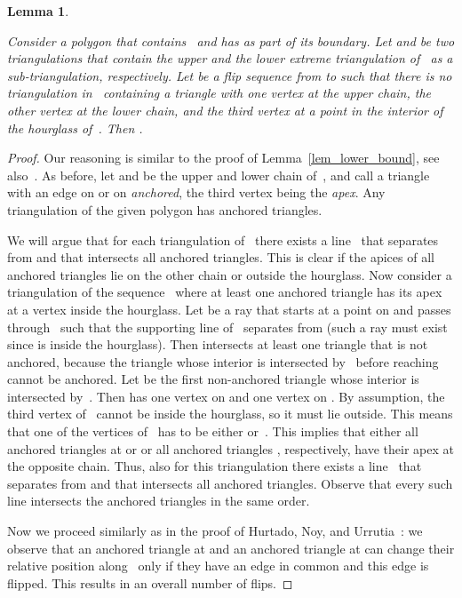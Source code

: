 \documentclass[a4paper,11pt]{article}
\newtheorem{lemma}[theorem]{Lemma}
\newcommand{\qedopt}{}
\begin{document}
\begin{lemma}\label{lem_empty_wedge}
\begin{sloppypar}
Consider a polygon that contains~ and has  as part of 
its boundary. Let  and  be two triangulations that contain the upper and 
the lower extreme triangulation of~ as a sub-triangulation, respectively.
Let  be a flip sequence from  to  such that there is no triangulation in~ containing a triangle with one vertex at the upper chain, the other vertex at the lower chain, and the third vertex at a point in the interior of the hourglass of~.
Then .
\end{sloppypar}
\end{lemma}
\begin{proof}
Our reasoning is similar to the proof of Lemma~\ref{lem_lower_bound}, 
see also~\cite{lubiw}. As before, let  and 
be the upper and lower chain of~, and call a
triangle with an edge on  or on  \emph{anchored},
the third vertex being the \emph{apex}.
Any triangulation of the given polygon has  anchored triangles.

We will argue that for each triangulation of~ there 
exists a line~ that separates  from 
and that intersects all anchored triangles.
This is clear if the apices of all anchored triangles
lie on the other chain or outside the hourglass.
Now consider a triangulation of the sequence~ where 
at least one anchored triangle has its apex at a 
vertex  inside the hourglass.
Let  be a ray that starts at a point on  and 
passes through~ such that the supporting line of~ separates 
 from  (such a ray must exist 
since  is inside the hourglass).
Then  intersects at least one triangle that 
is not anchored, because the triangle whose interior is intersected 
by~ before reaching  cannot be anchored.
Let  be the first non-anchored triangle whose 
interior is intersected by~.
Then  has one vertex on 
and one vertex on . By assumption, the 
third vertex of~  cannot be inside the hourglass,
so it must lie outside.
This means that one of the vertices 
of~ has to be either  or~.
This  implies that either all anchored triangles at  or
or all anchored triangles , 
respectively, have their apex at the opposite chain.
Thus, also for this triangulation there exists a line~ 
that separates  from  and that 
intersects all anchored triangles. Observe that every such line
intersects the anchored triangles in the same order.

Now we proceed similarly as in the proof 
of Hurtado, Noy, and Urrutia~\cite{hurtado_noy_urrutia}: 
we observe that an anchored triangle at   and an anchored triangle 
at  can change their relative position 
along~ only if they have an edge in common and this edge is flipped.
This results in an overall number of  flips.
\qedopt
\end{proof}
\end{document}
